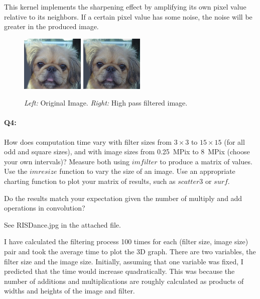     This kernel implements the sharpening effect by amplifying its own pixel value relative to its neighbors. If a certain pixel value has some noise, the noise will be greater in the produced image.
    \begin{figure}[h]
        \centering
        \includegraphics[width=3cm]{original.jpg}
        \includegraphics[width=3cm]{highpass.jpg}
        \caption{\emph{Left:} Original Image. \emph{Right:} High pass filtered image.}
    \end{figure}



	\pagebreak
	\paragraph{Q4:} How does computation time vary with filter sizes from $3\times3$ to $15\times15$ (for all odd and square sizes), and with image sizes from 0.25~MPix to 8~MPix (choose your own intervals)? Measure both using \href{https://www.mathworks.com/help/images/ref/imfilter.html}{$imfilter$} to produce a matrix of values. Use the \href{https://www.mathworks.com/help/images/ref/imresize.html}{$imresize$} function to vary the size of an image. Use an appropriate charting function to plot your matrix of results, such as \href{https://www.mathworks.com/help/matlab/ref/scatter3.html}{$scatter3$} or \href{https://www.mathworks.com/help/matlab/ref/surf.html}{$surf$}.

	Do the results match your expectation given the number of multiply and add operations in convolution?

	See RISDance.jpg in the attached file.

    I have calculated the filtering process 100 times for each (filter size, image size) pair and took the average time to plot the 3D graph. There are two variables, the filter size and the image size. Initially, assuming that one variable was fixed, I predicted that the time would increase quadratically. This was because the number of additions and multiplications are roughly calculated as products of widths and heights of the image and filter.

